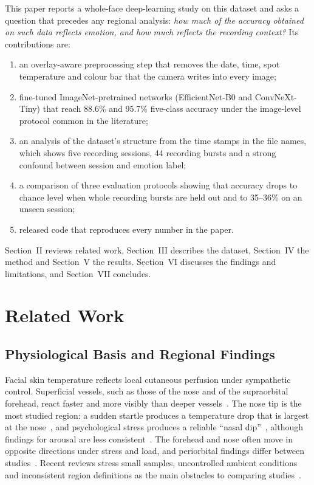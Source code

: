 \documentclass[10pt,twocolumn,letterpaper]{article}
\begin{document}
This paper reports a whole-face deep-learning study on this dataset and asks a question that precedes any regional analysis: \emph{how much of the accuracy obtained on such data reflects emotion, and how much reflects the recording context?} Its contributions are:
\begin{enumerate}
\item an overlay-aware preprocessing step that removes the date, time, spot temperature and colour bar that the camera writes into every image;
\item fine-tuned ImageNet-pretrained networks (EfficientNet-B0 and ConvNeXt-Tiny) that reach 88.6\% and 95.7\% five-class accuracy under the image-level protocol common in the literature;
\item an analysis of the dataset's structure from the time stamps in the file names, which shows five recording sessions, 44 recording bursts and a strong confound between session and emotion label;
\item a comparison of three evaluation protocols showing that accuracy drops to chance level when whole recording bursts are held out and to 35--36\% on an unseen session;
\item released code that reproduces every number in the paper.
\end{enumerate}
Section~II reviews related work, Section~III describes the dataset, Section~IV the method and Section~V the results. Section~VI discusses the findings and limitations, and Section~VII concludes.

\section{Related Work}

\subsection{Physiological Basis and Regional Findings}
Facial skin temperature reflects local cutaneous perfusion under sympathetic control. Superficial vessels, such as those of the nose and of the supraorbital forehead, react faster and more visibly than deeper vessels~\cite{ioannou2014}. The nose tip is the most studied region: a sudden startle produces a temperature drop that is largest at the nose~\cite{levine2001}, and psychological stress produces a reliable ``nasal dip''~\cite{engert2014}, although findings for arousal are less consistent~\cite{kosonogov2017,salazar2015}. The forehead and nose often move in opposite directions under stress and load, and periorbital findings differ between studies~\cite{ioannou2014}. Recent reviews stress small samples, uncontrolled ambient conditions and inconsistent region definitions as the main obstacles to comparing studies~\cite{ioannou2014,nazzari2025}.
\end{document}
